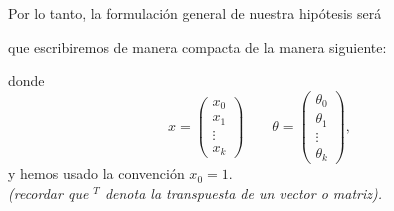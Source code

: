 \documentclass[aspectratio=169]{beamer}
\begin{document}
\begin{frame}
Por lo tanto, la formulación general de nuestra hipótesis será
\begin{center}
\end{center}
 que escribiremos de manera compacta de la manera siguiente:
\begin{center}
\end{center}
 donde
$$x=\left(
\begin{array}{l}
x_0\\x_1\\\vdots\\x_k  
\end{array}\right)
\qquad \theta=\left(\begin{array}{l}
\theta_0\\\theta_1\\\vdots\\\theta_k  
\end{array}\right)
,$$
y hemos usado la convención $x_0=1$.\\
\textit{(recordar que ${}^T$ denota la transpuesta de un vector o matriz).} 

\end{frame}
\end{document}
